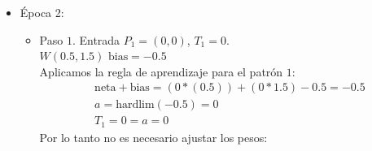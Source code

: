 \documentclass{article}
\begin{document}
{{\begin{itemize}
\begin{itemize}
\item Paso $3$. Entrada $P_3 = (1, 0)$, $T_3 = 0$. \\
$W(0.5, 0.5)$  $\text{bias} = -0.5$ \\

Aplicamos la regla de aprendizaje para el patrón $3$:
\begin{align*}
&\text{neta} + \text{bias}= (1 * 0.5) + (0 * 0.5) - 0.5 = 0\\
&a = \text{hardlim}(0) = 1 \\
&T_3 = 0 \neq a = 1
\end{align*}
Por lo tanto es necesario ajustar los pesos:
\begin{align*}
&e = T_3- a = 0- 1=-1, \\
&W_n = W + e* P_3 = (0.5, 0.5) + (-1) * (1,0) = (-0.5, 0.5) \\
&\text{bias}_N = \text{bias} + e = -0.5 + (-1) = -1.5
\end{align*}



\item Paso $4$. Entrada $P_4 = (1, 1)$, $T_4 = 1$. \\
$W(-0.5, 0.5)$  $\text{bias} = -1.5$ \\

Aplicamos la regla de aprendizaje para el patrón $4$:
\begin{align*}
&\text{neta} + \text{bias}= (1 * (-0.5)) + (1 * 0.5) - 1.5 = -1.5\\
&a = \text{hardlim}(-1.5) = 0 \\
&T_4 = 1 \neq a = 0
\end{align*}
Por lo tanto es necesario ajustar los pesos:
\begin{align*}
&e = T_4- a = 1- 0= 1, \\
&W_n = W + e* P_4 = (-0.5, 0.5) + (1) * (1,1) = (0.5, 1.5) \\
&\text{bias}_N = \text{bias} + e = -1.5 + 1 = -0.5
\end{align*}

\end{itemize}

\item Época 2:

\begin{itemize}
\item Paso $1$. Entrada $P_1 = (0, 0)$, $T_1 = 0$. \\
$W(0.5, 1.5)$  $\text{bias} = -0.5$ \\

Aplicamos la regla de aprendizaje para el patrón $1$:
\begin{align*}
&\text{neta} + \text{bias}= (0 * (0.5)) + (0 * 1.5) - 0.5 = -0.5\\
&a = \text{hardlim}(-0.5) = 0 \\
&T_1 = 0 = a = 0
\end{align*}
Por lo tanto no es necesario ajustar los pesos:


\end{itemize}
\end{itemize}}}
\end{document}
